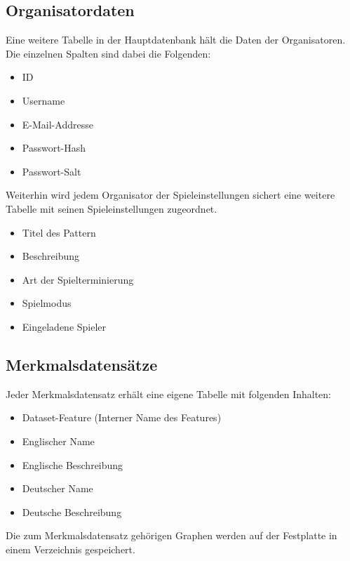 \documentclass[a4paper]{scrreprt}
\begin{document}
	\subsection{Organisatordaten}
	Eine weitere Tabelle in der Hauptdatenbank hält die Daten der Organisatoren.
	Die einzelnen Spalten sind dabei die Folgenden:
	\begin{itemize}
		\item ID
		\item Username
		\item E-Mail-Addresse
		\item Passwort-Hash
		\item Passwort-Salt
	\end{itemize}
	Weiterhin wird jedem Organisator der Spieleinstellungen sichert eine weitere Tabelle mit seinen Spieleinstellungen zugeordnet.
	\begin{itemize}
		\item Titel des Pattern
		\item Beschreibung
		\item Art der Spielterminierung
		\item Spielmodus
		\item Eingeladene Spieler
	\end{itemize}
	\subsection{Merkmalsdatensätze}
	Jeder Merkmalsdatensatz erhält eine eigene Tabelle mit folgenden Inhalten:
	\begin{itemize}
		\item Dataset-Feature (Interner Name des Features)
		\item Englischer Name
		\item Englische Beschreibung
		\item Deutscher Name
		\item Deutsche Beschreibung
	\end{itemize}
	Die zum Merkmalsdatensatz gehörigen Graphen werden auf der Festplatte in einem Verzeichnis gespeichert.
\end{document}

